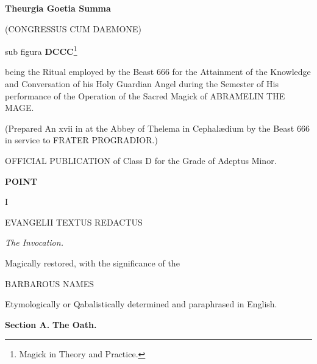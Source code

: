 
\begin{center}
  \large
  \textbf{Theurgia Goetia Summa}

  (CONGRESSUS CUM DAEMONE)

sub figura \textbf{DCCC}\footnote{Magick in Theory and Practice.}
\end{center}

being the Ritual employed by the Beast 666 for the Attainment of the Knowledge and Conversation of his Holy Guardian Angel during the Semester of His performance of the Operation of the Sacred Magick of ABRAMELIN THE MAGE.

(Prepared An xvii \sun{} in \virgo{} at the Abbey of Thelema in Cephal\ae{}dium by the Beast 666 in service to FRATER PROGRADIOR.)

OFFICIAL PUBLICATION of \Argentium{} Class D for the Grade of Adeptus Minor.

\clearpage
\begin{center}
\textbf{POINT}

I

EVANGELII TEXTUS REDACTUS
\end{center}

\textit{The Invocation.}

Magically restored, with the significance of the

\begin{center}
  BARBAROUS NAMES
\end{center}

Etymologically or Qabalistically determined and paraphrased in English.

\textbf{Section A.} \hfill \textbf{The Oath.}

